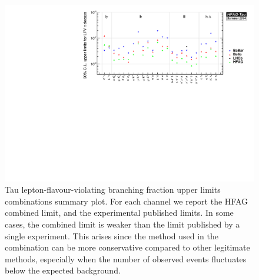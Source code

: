 \begin{figure}[tb]
  \begin{center}
    \includegraphics[angle=270,totalheight=0.86\textheight,clip]{TauLFV_combs.pdf}
    \caption{Tau lepton-flavour-violating branching fraction upper limits
      combinations summary plot. For each channel we report the HFAG
      combined limit, and the experimental published limits. In some cases,
      the combined limit is weaker than the limit published by a single
      experiment. This arises since the \cls method used in the
      combination can be more conservative compared to other legitimate
      methods, especially when the number of observed events fluctuates below the
      expected background. 
      \label{fig:tau:lfv-limits-plot-average}
    }
  \end{center}
\end{figure}

